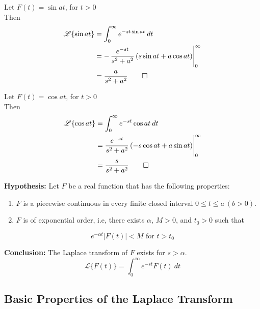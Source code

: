 \documentclass[12pt]{article}
\newcommand{\Lap}{\mathscr{L}}
\begin{document}
\newpage
\begin{multicols}{2}
    Let $F(t) = \sin{at}$, for $t>0$ \\
    Then\\
    \begin{align*}
        \Lap \{ \sin{at} \} &= \int_{0}^{\infty} { e^{-s t \sin{at}} } \: d{t} \\
        &= - \eval{ \frac{e^{-s t}}{s^2+a^2} \left( s\sin{at} + a\cos{at} \right) }_{0}^{\infty} \\
        &= \frac{a}{s^2+a^2}\qed
    \end{align*}
    \columnbreak
    
    Let $F(t) = \cos{at}$, for $t>0$ \\
    Then\\
    \begin{align*}
        \Lap \{ \cos{at} \} &= \int_{0}^{\infty} { e^{-s t}\cos{at} } \: d{t} \\
        &= \eval{ \frac{e^{-s t}}{s^2+a^2} \left( -s\cos{at} + a\sin{at} \right) }_{0}^{\infty} \\
        &= \frac{s}{s^2+a^2}\qed
    \end{align*}
\end{multicols}


\vspace{30pt}
\begin{theorem}{}{}
    \textbf{Hypothesis: } Let $F$ be a real function that has the following properties:
    \begin{enumerate}
        \item $F$ is a piecewise continuous in every finite closed interval $0 \le t \le a \: (b>0)$.
        \item $F$ is of exponential order, i.e, there exists $\alpha$, $M>0$, and $t_0>0$ such that
    \end{enumerate}
    \[ e^{-\alpha t}|F(t)| < M \text{ for } t>t_0 \]
    
    \textbf{Conclusion: } The Laplace transform of $F$ exists for $s>\alpha$.
    \[
        \Lap \{ F(t) \} = \int_{0}^{\infty} {e^{-s t}F(t)} \: d{t}
    \] 
\end{theorem}


\vspace{30pt}
\subsection{Basic Properties of the Laplace Transform}
\end{document}

